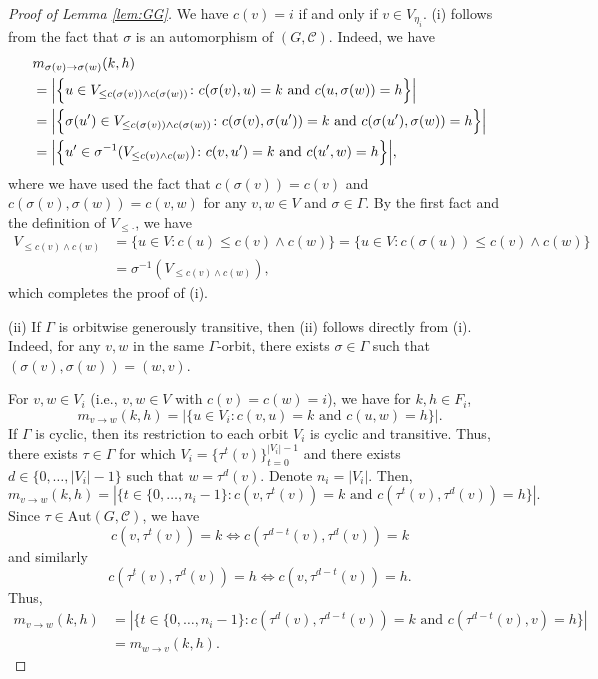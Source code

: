 \documentclass[12pt]{amsart}
\theoremstyle{plain}
\theoremstyle{definition}
\theoremstyle{remark}
\newcommand{\1}{\mathbf{1}}
\begin{document}
\begin{proof}[Proof of Lemma \ref{lem:GG}]
We have $c(v)=i$ if and only if $v\in V_{\eta_i}$. 
(i) follows from the fact that $\sigma$ is an automorphism of $(G,\mathcal{C})$. Indeed, we have 
\begin{align*}
 &m_{\sigma(v)\to \sigma(w)}(k,h)\\
 &=
\Bigl| \Big\{ u \in V_{\le c(\sigma(v)) \wedge c(\sigma(w))} \colon c(\sigma(v),u)=k\mbox{ and } c(u,\sigma(w))=h\Big\} \Bigr| \\
 &=
\Bigl| \Big\{ \sigma(u') \in V_{\le c(\sigma(v)) \wedge c(\sigma(w))} \colon c(\sigma(v),\sigma(u'))=k\mbox{ and } c(\sigma(u'),\sigma(w))=h\Big\} \Bigr| \\
 &=
\Bigl| \Big\{ u' \in \sigma^{-1}(V_{\le c(v) \wedge c(w)}) \colon c(v,u')=k\mbox{ and } c(u',w)=h\Big\} \Bigr|,
\end{align*}
where we have used the fact that $c(\sigma(v))=c(v)$ and $c(\sigma(v),\sigma(w))=c(v,w)$ for any $v,w\in V$ and $\sigma\in\Gamma$. 
By the first fact and the definition of $V_{\leq \cdot}$, we have 
\begin{align*}
V_{\le c(v) \wedge c(w)} &= \{u\in V\colon c(u)\leq c(v)\wedge c(w)\} = \{u\in V\colon c(\sigma(u))\leq c(v)\wedge c(w)\}  \\
&=  \sigma^{-1}(V_{\le c(v) \wedge c(w)}),
\end{align*}
which completes the proof of (i).

(ii) If $\Gamma$ is orbitwise generously transitive, then (ii) follows
directly from (i). Indeed, for any $v,w$ in the same $\Gamma$-orbit, there exists
$\sigma\in\Gamma$ such that
$(\sigma(v),\sigma(w))=(w,v)$.

For $v,w\in V_i$ (i.e., $v,w\in V$ with  $c(v)=c(w)=i$), we have for $k,h\in F_i$, 
\[
m_{v\to w}(k,h) = |\{ u\in V_i\colon c(v,u)=k\mbox{ and }c(u,w)=h\}|. 
\]
If $\Gamma$ is cyclic, then its restriction to each orbit $V_i$ is cyclic and transitive. Thus, there exists $\tau\in\Gamma$ for which $V_i= \{\tau^t(v)\}_{t=0}^{|V_i|-1}$ and there exists $d\in\{0,\ldots,|V_i|-1\}$ such that 
$w=\tau^d(v)$. Denote $n_i=|V_i|$. Then, 
\[
m_{v\to w}(k,h) = |\{ t\in \{0,\ldots,n_i-1\}\colon c(v,\tau^t(v))=k\mbox{ and }c(\tau^t(v),\tau^d(v))=h\}|. 
\]
Since $\tau\in\mathrm{Aut}(G,\mathcal{C})$, we have 
\[
c(v,\tau^t(v))=k \iff c(\tau^{d-t}(v),\tau^d(v))=k 
\]
and similarly
\[
c(\tau^t(v),\tau^d(v))=h\iff c(v,\tau^{d-t}(v))=h. 
\]
Thus,
\begin{align*}
m_{v\to w}(k,h) &= |\{ t\in \{0,\ldots,n_i-1\}\colon c(\tau^d(v),\tau^{d-t}(v))=k\mbox{ and }c(\tau^{d-t}(v),v)=h\}|\\
&=m_{w\to v}(k,h). 
\end{align*}

\end{proof}
\end{document}
